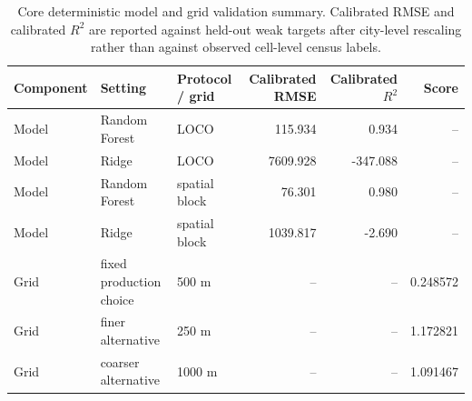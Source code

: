 \begin{table}[H]
\centering
\footnotesize
\setlength{\tabcolsep}{4pt}
\renewcommand{\arraystretch}{1.12}
\caption{Core deterministic model and grid validation summary. Calibrated RMSE and calibrated $R^2$ are reported against held-out weak targets after city-level rescaling rather than against observed cell-level census labels.}
\label{tab:core-deterministic-validation}
\begin{adjustbox}{max width=\textwidth}
\begin{tabularx}{\textwidth}{L{1.65cm} Y L{2.10cm} r r r}
\toprule
Component & Setting & Protocol / grid & Calibrated RMSE & Calibrated $R^2$ & Score \\
\midrule
Model & Random Forest & LOCO & 115.934 & 0.934 & -- \\
Model & Ridge & LOCO & 7609.928 & -347.088 & -- \\
Model & Random Forest & spatial block & 76.301 & 0.980 & -- \\
Model & Ridge & spatial block & 1039.817 & -2.690 & -- \\
\midrule
Grid & fixed production choice & 500 m & -- & -- & 0.248572 \\
Grid & finer alternative & 250 m & -- & -- & 1.172821 \\
Grid & coarser alternative & 1000 m & -- & -- & 1.091467 \\
\bottomrule
\end{tabularx}
\end{adjustbox}
\end{table}
